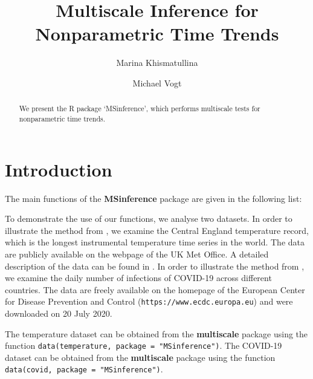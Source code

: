 \documentclass[a4paper]{scrartcl}
\title{Multiscale Inference for Nonparametric Time Trends}
\author{Marina Khismatullina \and Michael Vogt}
\begin{document}


\maketitle

\begin{abstract}
We present the R package `MSinference', which performs multiscale tests for nonparametric time trends.
\end{abstract}

\tableofcontents

\section{Introduction}
The main functions of the \textbf{MSinference} package are given in
the following list:

To demonstrate the use of our functions, we analyse two datasets. In order to illustrate the method from \cite{KhismatullinaVogt2020}, we examine the Central England temperature record, which is the longest instrumental temperature time series in the world. The data are publicly available on the webpage of the UK Met Office. A detailed description of the data can be found in \cite{Parker1992}. In order to illustrate the method from \cite{KhismatullinaVogt2023}, we examine the daily number of infections of COVID-19 across different countries. The data are freely available on the homepage of the European Center for Disease Prevention and Control (\texttt{https://www.ecdc.europa.eu}) and were downloaded on 20 July 2020.

The temperature dataset can be obtained from the \textbf{multiscale} package using the function \verb|data(temperature, package = "MSinference")|. The COVID-19 dataset can be obtained from the \textbf{multiscale} package using the function \linebreak \verb|data(covid, package = "MSinference")|.
\end{document}
